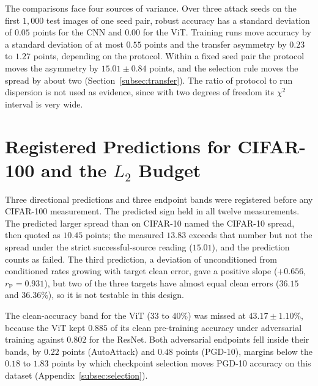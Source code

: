 The comparisons face four sources of variance. Over three attack seeds on the first $1{,}000$ test images of one seed pair, robust accuracy has a standard deviation of $0.05$ points for the CNN and $0.00$ for the ViT. Training runs move accuracy by a standard deviation of at most $0.55$ points and the transfer asymmetry by $0.23$ to $1.27$ points, depending on the protocol. Within a fixed seed pair the protocol moves the asymmetry by $15.01\pm0.84$ points, and the selection rule moves the spread by about two (Section~\ref{subsec:transfer}). The ratio of protocol to run dispersion is not used as evidence, since with two degrees of freedom its $\chi^2$ interval is very wide.

\section{Registered Predictions for CIFAR-100 and the $L_2$ Budget}
\label{app:registrations}

Three directional predictions and three endpoint bands were registered before any CIFAR-100 measurement. The predicted sign held in all twelve measurements. The predicted larger spread than on CIFAR-10 named the CIFAR-10 spread, then quoted as $10.45$ points; the measured $13.83$ exceeds that number but not the spread under the strict successful-source reading ($15.01$), and the prediction counts as failed. The third prediction, a deviation of unconditioned from conditioned rates growing with target clean error, gave a positive slope ($+0.656$, $r_{\mathrm{P}} = 0.931$), but two of the three targets have almost equal clean errors ($36.15$ and $36.36\%$), so it is not testable in this design.

The clean-accuracy band for the ViT ($33$ to $40\%$) was missed at $43.17\pm1.10\%$, because the ViT kept $0.885$ of its clean pre-training accuracy under adversarial training against $0.802$ for the ResNet. Both adversarial endpoints fell inside their bands, by $0.22$ points (AutoAttack) and $0.48$ points (PGD-10), margins below the $0.18$ to $1.83$ points by which checkpoint selection moves PGD-10 accuracy on this dataset (Appendix~\ref{subsec:selection}).

